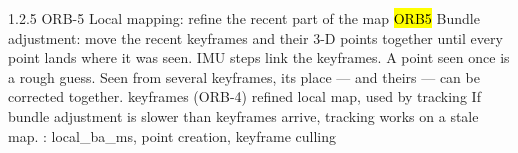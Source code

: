 \begin{frame}{1.2.5 \;ORB-5 \;Local mapping: refine the recent part of the map}
  \hl{ORB5}
  {Bundle adjustment: move the recent keyframes and their 3-D points together
   until every point lands where it was seen. IMU steps link the keyframes.}
  {A point seen once is a rough guess. Seen from several keyframes, its place
   --- and theirs --- can be corrected together.}
  {keyframes (ORB-4)}
  {refined local map, used by tracking}
  {If bundle adjustment is slower than keyframes arrive, tracking works on a stale map.}
  {: local\_ba\_ms, point creation, keyframe culling}
\end{frame}

